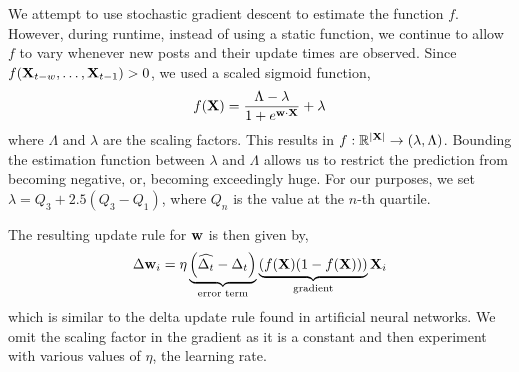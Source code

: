 We attempt to use stochastic gradient descent to estimate the function $f$.  
However, during runtime, instead of using a static function, we continue to 
allow $f$ to vary whenever new posts and their update times are observed.
Since $f(\mathbf{X}_{t-w},\hdots,\mathbf{X}_{t-1}) > 0$, we used a scaled sigmoid function,
\[
	f(\mathbf{X}) = \frac{\Lambda-\lambda}{1 + e^{\mathbf{w} \cdot \mathbf{X}}} + \lambda
\]
where $\Lambda$ and $\lambda$ are the scaling factors. This results in $f: 
\mathbb{R}^{|\mathbf{X}|}  \rightarrow (\lambda,\Lambda)$. Bounding the estimation 
function between $\lambda$ and $\Lambda$ allows us to restrict the prediction 
from becoming negative, or, becoming exceedingly huge. For our purposes, we set 
$\lambda = Q_3 + 2.5(Q_{3} - Q_{1})$, where $Q_n$ is the value at the $n$-th 
quartile. 

The resulting update rule for $\mathbf{w}$ is then given by,
\[
	\Delta \mathbf{w}_i = \eta
				\underbrace{\left(\widehat{\Delta_t} - \Delta_t \right)}_{\text{error term}}
				\underbrace{\left( f(\mathbf{X})(1-f(\mathbf{X})) \right)}_{\text{gradient}}
						\mathbf{X}_i
\]
which is similar to the delta update rule found in artificial neural networks.  
We omit the scaling factor in the gradient as it is a constant and then 
experiment with various values of $\eta$, the learning rate. 

